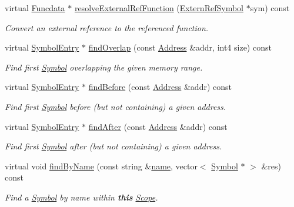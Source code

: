 \begin{DoxyCompactItemize}
virtual \mbox{\hyperlink{class_funcdata}{Funcdata}} $\ast$ \mbox{\hyperlink{class_scope_ghidra_afdb2e6de63033bb78e6c4168c8e25227}{resolve\+External\+Ref\+Function}} (\mbox{\hyperlink{class_extern_ref_symbol}{Extern\+Ref\+Symbol}} $\ast$sym) const
\begin{DoxyCompactList}\small\item\em Convert an {\itshape external} {\itshape reference} to the referenced function. \end{DoxyCompactList}\item 
virtual \mbox{\hyperlink{class_symbol_entry}{Symbol\+Entry}} $\ast$ \mbox{\hyperlink{class_scope_ghidra_afb59d45c8fa404fe023e054b255d5a3d}{find\+Overlap}} (const \mbox{\hyperlink{class_address}{Address}} \&addr, int4 size) const
\begin{DoxyCompactList}\small\item\em Find first \mbox{\hyperlink{class_symbol}{Symbol}} overlapping the given memory range. \end{DoxyCompactList}\item 
virtual \mbox{\hyperlink{class_symbol_entry}{Symbol\+Entry}} $\ast$ \mbox{\hyperlink{class_scope_ghidra_a2a7be1b0ee6c1c51d04bb5ae0ea0b721}{find\+Before}} (const \mbox{\hyperlink{class_address}{Address}} \&addr) const
\begin{DoxyCompactList}\small\item\em Find first \mbox{\hyperlink{class_symbol}{Symbol}} before (but not containing) a given address. \end{DoxyCompactList}\item 
virtual \mbox{\hyperlink{class_symbol_entry}{Symbol\+Entry}} $\ast$ \mbox{\hyperlink{class_scope_ghidra_a0be881d3586a43ba0b8c4e412ab74005}{find\+After}} (const \mbox{\hyperlink{class_address}{Address}} \&addr) const
\begin{DoxyCompactList}\small\item\em Find first \mbox{\hyperlink{class_symbol}{Symbol}} after (but not containing) a given address. \end{DoxyCompactList}\item 
virtual void \mbox{\hyperlink{class_scope_ghidra_a26072ceb4215a022050d12b9487e3e87}{find\+By\+Name}} (const string \&\mbox{\hyperlink{class_scope_abb4900f6409e8a82c1b1cea827e4e2c5}{name}}, vector$<$ \mbox{\hyperlink{class_symbol}{Symbol}} $\ast$ $>$ \&res) const
\begin{DoxyCompactList}\small\item\em Find a \mbox{\hyperlink{class_symbol}{Symbol}} by name within {\bfseries{this}} \mbox{\hyperlink{class_scope}{Scope}}. \end{DoxyCompactList}\item 

\end{DoxyCompactItemize}
